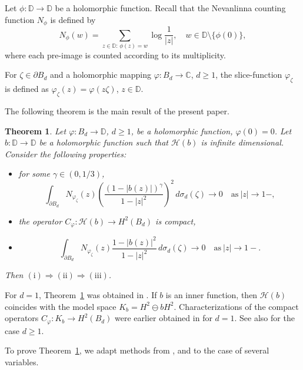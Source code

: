 \documentclass{amsart}
\numberwithin{equation}{section}
\newtheorem{theorem}{Theorem}[section]
\theoremstyle{definition}
\newcommand{\bd}{{B_d}}
\newcommand{\neva}{N}
\newcommand{\meal}{\sigma_d}
\newcommand{\dbr}{\mathcal{H}}
\newcommand{\za}{\zeta}
\newcommand{\ph}{\varphi}
\newcommand{\cph}{C_\varphi}
\newcommand{\Dbb}{\mathbb D}
\newcommand{\Cbb}{\mathbb C}
\newcommand{\spd}{\partial B_d}
\begin{document}
Let $\phi:\Dbb \to \Dbb$ be a holomorphic function.
Recall that the Nevanlinna counting function $\neva_\phi$ is defined by
\begin{equation}\label{e_neva}
\neva_{\phi}(w) = \sum_{z\in \Dbb:\, \phi(z)=w} \log\frac{1}{|z|}, \quad w\in\Dbb\setminus\{\phi(0)\},
\end{equation}
where each pre-image is counted according to its multiplicity.

For $\za\in\spd$ and a holomorphic mapping $\ph: \bd\to\Cbb$, $d\ge 1$, the slice-function $\ph_\za$ 
is defined as $\ph_\za(z) = \ph (z\za)$, $z\in\Dbb$.

The following theorem is the main result of the present paper.

\begin{theorem}\label{t_cph_tri}
Let $\ph: \bd\to\Dbb$, $d \ge 1$, be a holomorphic function, $\ph(0)=0$.
Let $b: \Dbb\to \Dbb$ be a holomorphic function such that $\dbr(b)$ is infinite dimensional.
Consider the following properties:
\begin{itemize}
  \item [(i)] for some $\gamma\in (0, 1/3)$,
  \begin{equation}\label{e_nevaGam0}
\int_{\spd}\neva_{\ph_\za}(z) \left( \frac{(1-|b(z)|)^\gamma}{1-|z|^2} \right)^2 \, d\meal(\za)\to 0 \quad \textrm{as}\ |z|\to 1-,
\end{equation}
  \item [(ii)] the operator $\cph: \dbr(b) \to H^2(\bd)$ is compact,
  \item [(iii)]
 \begin{equation}\label{e_neva0}
\int_{\spd}\neva_{\ph_\za}(z) \frac{1-|b(z)|^2}{1-|z|^2} \, d\meal(\za)\to 0 \quad \textrm{as}\ |z|\to 1-.
\end{equation} 
\end{itemize}
Then $\mathrm{(i)} \Rightarrow \mathrm{(ii)} \Rightarrow \mathrm{(iii)}$.
\end{theorem}





For $d=1$, Theorem~\ref{t_cph_tri} was obtained in \cite{FKM19}.
%
If $b$ is an inner function, then $\dbr(b)$ coincides with the model space $K_b = H^2 \ominus bH^2$.
Characterizations of the compact operators $\cph: K_b \to H^2(\bd)$ were earlier obtained in \cite{LM13} for $d=1$.
See also \cite{Dou25CMB} for the case $d\ge 1$.

To prove Theorem~\ref{t_cph_tri}, we adapt methods from \cite{FKM19}, \cite{LM13} and \cite{ShJoel87}
to the case of several variables.
\end{document}
